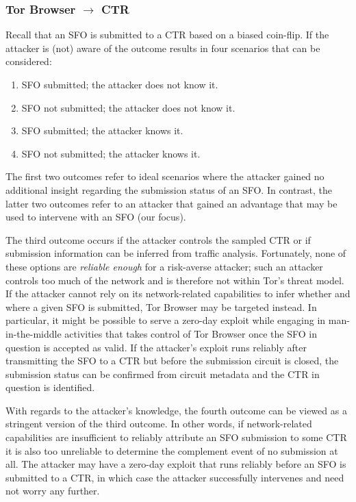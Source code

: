\subsubsection{Tor Browser $\rightarrow$ CTR} \label{sec:security-analysis:tb}
Recall that an SFO is submitted to a CTR based on a biased coin-flip.  If
the attacker is (not) aware of the outcome results in four scenarios
that can be considered:
\begin{enumerate}
	\item SFO submitted; the attacker does not know it.
	\item SFO not submitted; the attacker does not know it.
	\item SFO submitted; the attacker knows it.
	\item SFO not submitted; the attacker knows it.
\end{enumerate}

The first two outcomes refer to ideal scenarios where the attacker gained no
additional insight regarding the submission status of an SFO.  In contrast,
the latter two outcomes refer to an attacker that gained an advantage that may
be used to intervene with an SFO (our focus).

The third outcome occurs if the attacker controls the sampled CTR or if
submission information can be inferred from traffic analysis.  Fortunately, none
of these options are \emph{reliable enough} for a risk-averse attacker;
	such an attacker controls too much of the network and is therefore not
	within Tor's threat model.
If the attacker cannot rely on its network-related capabilities to infer whether
and where a given SFO is submitted, Tor Browser may be targeted instead.  In
particular, it might be possible to serve a zero-day exploit while engaging in
man-in-the-middle activities that takes control of Tor Browser once the SFO in
question is accepted as valid.  If the attacker's exploit runs reliably after
transmitting the SFO to a CTR but before the submission circuit is closed,
the submission status can be confirmed from circuit metadata and the CTR in
question is identified.

With regards to the attacker's knowledge, the fourth outcome can be viewed as a
stringent version of the third outcome.  In other words, if network-related
capabilities are insufficient to reliably attribute an SFO submission to some
CTR it is also too unreliable to determine the complement event of no submission
at all.  The attacker may have a zero-day exploit that runs reliably before
an SFO is submitted to a CTR, in which case the attacker successfully
intervenes and need not worry any further.


